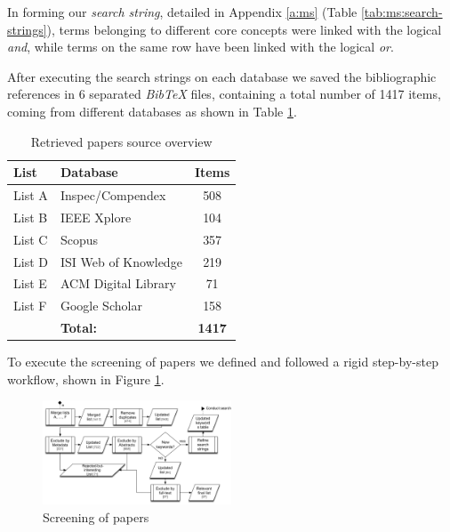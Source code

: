 \documentclass[final,5p,times,twocolumn]{elsarticle}
\begin{document}
In forming our \textit{search string}, detailed in Appendix \ref{a:ms} (Table \ref{tab:ms:search-strings}), terms belonging to different core concepts were linked with the logical \textit{and},  while terms on the same row have been linked with the logical \textit{or}.

After executing the search strings on each database we saved the bibliographic references in 6 separated \textit{BibTeX} files, containing a total number of 1417 items, coming from different databases as shown in Table \ref{tab:ms:retrieved-overview}.

\begin{table}[H]
\renewcommand{\arraystretch}{1.1}
\caption{Retrieved papers source overview}
\label{tab:ms:retrieved-overview}
\centering
\scriptsize \begin{tabular}{|l|l|c|}
\hline 
\hline 
List & Database & Items   \\
\hline
List A & Inspec/Compendex & 508 \\
List B & IEEE Xplore & 104 \\
List C & Scopus & 357 \\
List D & ISI Web of Knowledge & 219 \\
List E & ACM Digital Library & 71 \\
List F & Google Scholar & 158 \\
\hline
      & \textbf{Total:} & \textbf{1417} \\
\hline
\hline 

 \end{tabular}
 \end{table}


To execute the screening of papers we defined and followed a rigid step-by-step workflow, shown in Figure \ref{fig:ms:screening}. 

\begin{figure}[H]
\centering
\includegraphics[width=0.5\textwidth,keepaspectratio=true]{figures/screening.png}
\caption{Screening of papers }
\label{fig:ms:screening}
\end{figure}
\end{document}
